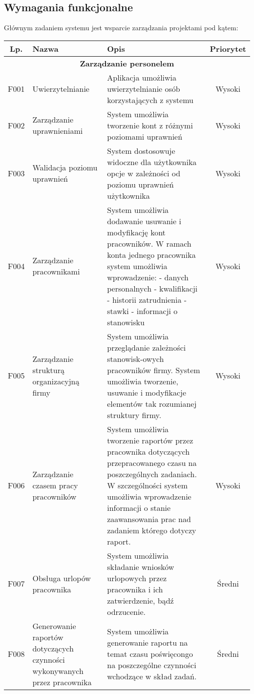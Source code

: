 \subsection{Wymagania funkcjonalne}
Głównym zadaniem systemu jest wsparcie zarządzania projektami pod kątem:

\begin{tabularx}{\textwidth}{|c|X|X|c|}
\hline 
Lp. & Nazwa & Opis & Priorytet \\ 
\hline 
\multicolumn{4}{|c|}{\textbf{Zarządzanie personelem}} \\
\hline 
F001 & Uwierzytelnianie & Aplikacja umożliwia uwierzytelnianie osób korzystających z systemu  & Wysoki \\ 
\hline 
F002 & Zarządzanie uprawnieniami & System umożliwia tworzenie kont z różnymi poziomami uprawnień & Wysoki \\ 
\hline 
F003 & Walidacja poziomu uprawnień & System dostosowuje widoczne dla użytkownika opcje w zależności od poziomu uprawnień użytkownika  & Wysoki \\ 
\hline 
F004 & Zarządzanie pracownikami & System umożliwia dodawanie usuwanie i modyfikację kont pracowników. W ramach konta jednego pracownika system umożliwia wprowadzenie: \newline
- danych personalnych \newline
- kwalifikacji \newline
- historii zatrudnienia \newline 
- stawki \newline
- informacji o stanowisku
& Wysoki \\
\hline 
F005 & Zarządzanie strukturą organizacyjną firmy & System umożliwia przeglądanie zależności stanowisk-owych pracowników firmy. System umożliwia tworzenie, usuwanie i modyfikacje elementów tak rozumianej struktury firmy. & Wysoki \\ 
\hline 
F006 & Zarządzanie czasem pracy pracowników & System umożliwia tworzenie raportów przez pracownika dotyczących przepracowanego czasu na poszczególnych zadaniach. W szczególności system umożliwia wprowadzenie informacji o stanie zaawansowania prac nad zadaniem którego dotyczy raport. & Wysoki \\ 
\hline 
F007 & Obsługa urlopów pracownika & System umożliwia składanie wniosków urlopowych przez pracownika i ich zatwierdzenie, bądź odrzucenie. & Średni\\
\hline 
F008 & Generowanie raportów dotyczących czynności wykonywanych przez pracownika & System umożliwia generowanie raportu na temat czasu poświęcongo na poszczególne czynności wchodzące w skład zadań. & Średni \\

\end{tabularx}
